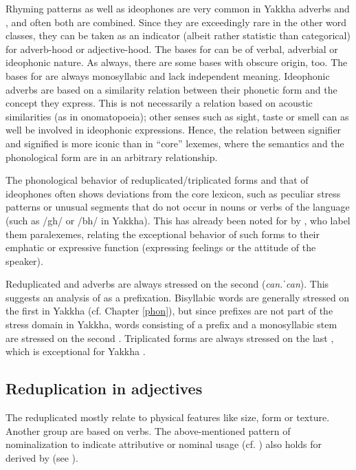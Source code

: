 Rhyming patterns as well as ideophones are very common in Yakkha adverbs and , and often both are combined. Since they are exceedingly rare in the other word classes, they can be taken as an indicator (albeit rather statistic than categorical) for adverb-hood or adjective-hood. The bases for  can be of verbal, adverbial or ideophonic nature. As always, there are some  bases with obscure origin, too. The bases for  are always monosyllabic and lack independent meaning. Ideophonic adverbs are based on a similarity relation between their phonetic form and the concept they express. This is not necessarily a relation based on acoustic similarities (as in onomatopoeia); other senses such as sight, taste or smell can as well be involved in ideophonic expressions. Hence, the relation between signifier and signified is more iconic than in “core” lexemes, where the semantics and the phonological form are in an arbitrary relationship.

The phonological behavior of reduplicated/triplicated forms and that of ideophones often shows deviations from the core lexicon, such as peculiar stress patterns or unusual segments that do not occur in nouns or verbs of the language (such as /gh/ or /bh/ in Yakkha). This has already been noted for  by \citet{Raietal1997Triplicated}, who label them paralexemes, relating the exceptional behavior of such forms to their emphatic or expressive function (expressing feelings or the attitude of the speaker). 

Reduplicated  and adverbs are always stressed on the second  (\emph{can.ˈcan}). This suggests an analysis of  as a prefixation. Bisyllabic words are generally stressed on the first  in Yakkha (cf. Chapter \ref{phon}), but since prefixes are not part of the stress domain in Yakkha, words consisting of a prefix and a monosyllabic stem are stressed on the second . Triplicated forms are always stressed on the last , which is exceptional for Yakkha . 

\subsection{Reduplication in adjectives}

The reduplicated  mostly relate to physical features like size, form or texture. Another group are   based on  verbs. The above-mentioned pattern of nominalization to indicate attributive or nominal usage (cf. ) also holds for  derived by  (see \Next). 

